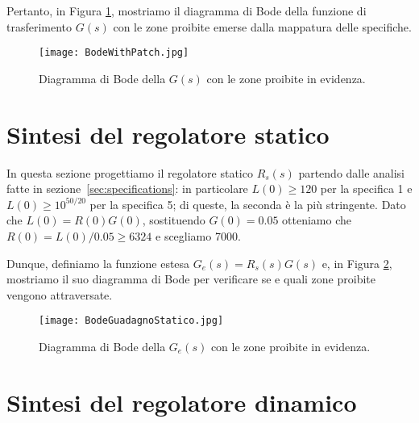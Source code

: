 \documentclass[a4paper, 11pt]{article}
\begin{document}
Pertanto, in Figura \ref{fig:patchedG}, mostriamo il diagramma di Bode della funzione di trasferimento $G(s)$ con le zone proibite emerse dalla mappatura delle specifiche.

\begin{figure}[h!]
	\centering
	\texttt{[image: BodeWithPatch.jpg]}
	\caption{Diagramma di Bode della $G(s)$ con le zone proibite in evidenza.}
	\label{fig:patchedG}
\end{figure}

\newpage

\section{Sintesi del regolatore statico}
\label{sec:static_regulator}

In questa sezione progettiamo il regolatore statico $R_s(s)$ partendo dalle analisi fatte in sezione~\ref{sec:specifications}: in particolare $L(0) \ge 120$ per la specifica 1 e $L(0) \ge 10^{50/20}$ per la specifica 5; di queste, la seconda è la più stringente. Dato che $L(0) = R(0)G(0)$, sostituendo $G(0) = 0.05$ otteniamo che $R(0) = L(0)/0.05 \ge 6324$ e scegliamo 7000.

Dunque, definiamo la funzione estesa $G_e(s) = R_s(s)G(s)$ e, in Figura \ref{fig:Ge}, mostriamo il suo diagramma di Bode per verificare se e quali zone proibite vengono attraversate.

\begin{figure}[h!]
	\centering
	\texttt{[image: BodeGuadagnoStatico.jpg]}
	\caption{Diagramma di Bode della $G_e(s)$ con le zone proibite in evidenza.}
	\label{fig:Ge}
\end{figure}

\newpage

\section{Sintesi del regolatore dinamico}
\end{document}
